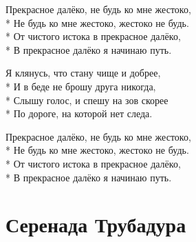 \medskip

\begin{minipage}{\linewidth}
\hspace*{1.5em}Прекрасное далёко, не будь ко мне жестоко,\\*
\hspace*{1.5em}Не будь ко мне жестоко, жестоко не будь.\\*
\hspace*{1.5em}От чистого истока в прекрасное далёко,\\*
\hspace*{1.5em}В прекрасное далёко я начинаю путь.\\
\end{minipage}\par\medskip\nobreak

\medskip

\begin{minipage}{\linewidth}
Я клянусь, что стану чище и добрее,\\*
И в беде не брошу друга никогда,\\*
Слышу голос, и спешу на зов скорее\\*
По дороге, на которой нет следа.\\
\end{minipage}\par\medskip\nobreak

\medskip

\begin{minipage}{\linewidth}
\hspace*{1.5em}Прекрасное далёко, не будь ко мне жестоко,\\*
\hspace*{1.5em}Не будь ко мне жестоко, жестоко не будь.\\*
\hspace*{1.5em}От чистого истока в прекрасное далёко,\\*
\hspace*{1.5em}В прекрасное далёко я начинаю путь.\\
\end{minipage}

\vspace{\fill}\newpage

\section{Серенада Трубадура}
\label{song:Серенада_Трубадура}

